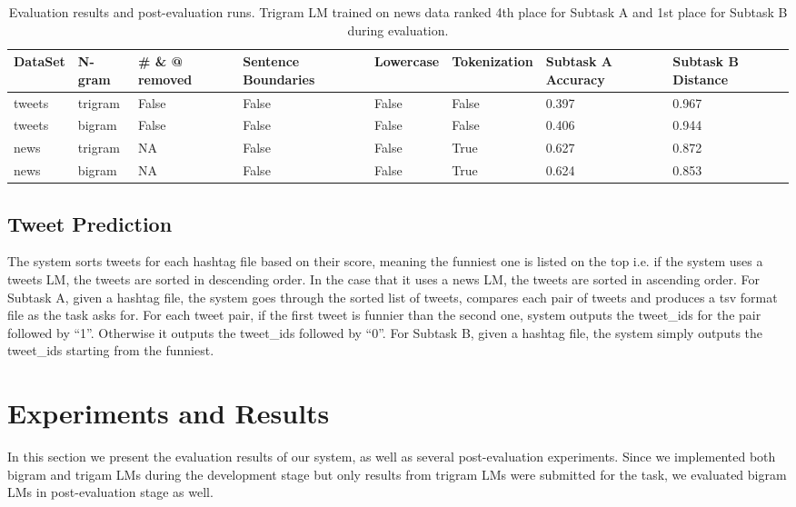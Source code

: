 \documentclass[11pt,a4paper]{article}
\begin{document}
\begin{table*}[h!]
\centering
\begin{tabular}{ |p{1.2cm}|p{1.2cm}|p{1.2cm}|p{1.7cm}|p{1.5cm}|p{1.9cm}|p{1.7cm}|p{1.7cm}|}
\hline
DataSet & N-gram & \# \& @ removed  & Sentence Boundaries & Lowercase & Tokenization & Subtask A Accuracy & Subtask B Distance \\
\hline
tweets & trigram & False & False & False & False & 0.397 & 0.967 \\
\hline
tweets & bigram & False & False & False & False & 0.406 & 0.944 \\
\hline
news & trigram & NA & False & False & True & 0.627 & 0.872 \\
\hline
news & bigram & NA & False & False & True & 0.624 & 0.853 \\
\hline
\end{tabular}
\caption{Evaluation results and post-evaluation runs. Trigram LM trained on news data ranked 4th place for Subtask A and 1st place for Subtask B during evaluation.}
\label{table:4}
\end{table*}



\subsection{Tweet Prediction}
The system sorts tweets for each hashtag file based on their score, meaning the funniest one is listed on the top i.e. if the system uses a tweets LM, the tweets are sorted in descending order. In the case that it uses a news LM, the tweets are sorted in ascending order. For Subtask A, given a hashtag file, the system goes through the sorted list of tweets, compares each pair of tweets and produces a tsv format file as the task asks for. For each tweet pair, if the first tweet is funnier than the second one, system outputs the tweet\_ids for the pair followed by ``1''. Otherwise it outputs the tweet\_ids followed by ``0''. For Subtask B, given a hashtag file, the system simply outputs the tweet\_ids starting from the funniest.


\section{Experiments and Results}
In this section we present the evaluation results of our system, as well as several post-evaluation experiments. Since we implemented both bigram and trigam LMs during the development stage but only results from trigram LMs were submitted for the task, we evaluated bigram LMs in post-evaluation stage as well. 
\end{document}
